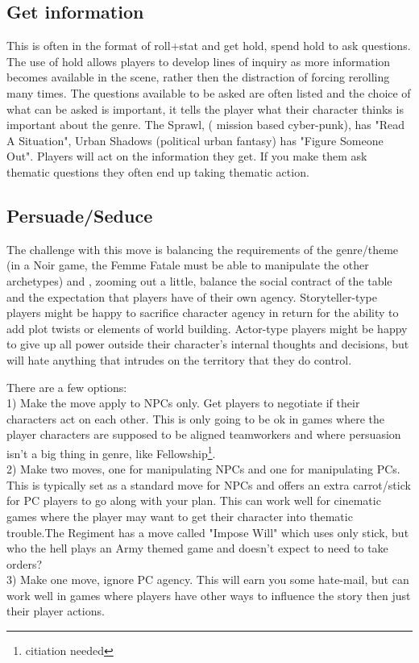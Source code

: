 \documentclass{tufte-handout}
\begin{document}
\subsection{Get information}
This is often in the format of roll+stat and get hold, spend hold to ask questions. The use of hold allows players to develop lines of inquiry as more information becomes available in the scene, rather then the distraction of forcing rerolling many times. 
The questions available to be asked are often listed and the choice of what can be asked is important, it tells the player what their character thinks is important about the genre. The Sprawl, ( mission based cyber-punk), has "Read A Situation", Urban Shadows (political urban fantasy) has "Figure Someone Out".
Players will act on the information they get. If you make them ask thematic questions they often end up taking thematic action.

\subsection{Persuade/Seduce}
The challenge with this move is  balancing the requirements of the genre/theme (in a Noir game, the Femme Fatale must be able to manipulate the other archetypes) and , zooming out a little, balance the social contract of the table and the expectation that players have of their own agency. Storyteller-type players might be happy to sacrifice character agency in return for the ability to add plot twists or elements of world building. Actor-type players might be happy to give up all power outside their character's internal thoughts and decisions, but will hate anything that intrudes on the territory that they do control.

There are a few options:\\
1) Make the move apply to NPCs only. Get players to negotiate if their characters act on each other. This is only going to be ok in games where the player characters are supposed to be aligned teamworkers and where persuasion isn't a big thing in genre, like Fellowship\footnote{citiation needed}. \\
2) Make two moves, one for manipulating NPCs and one for manipulating PCs. This is typically set as a standard move for NPCs and offers an extra carrot/stick for PC players to go along with your plan. This can work well for cinematic games where the player may want to get their character into thematic trouble.The Regiment has a move called "Impose Will" which uses only stick, but who the hell plays an Army themed game and doesn't expect to need to take orders?\\
3) Make one move, ignore PC agency. This will earn you some hate-mail, but can work well in games where players have other ways to influence the story then just their player actions. 
\end{document}
